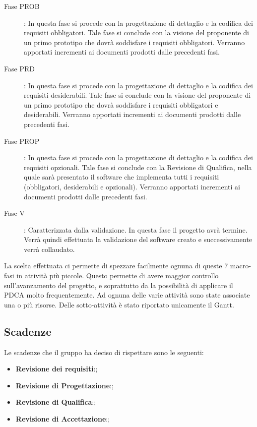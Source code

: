 \begin{description}
			\item[Fase PROB]: In questa fase si procede con la progettazione di dettaglio e la codifica dei requisiti obbligatori. Tale fase si conclude con la visione del proponente di un primo prototipo che dovrà soddisfare i requisiti obbligatori. Verranno apportati incrementi ai documenti prodotti dalle precedenti fasi.
			\item[Fase PRD]: In questa fase si procede con la progettazione di dettaglio e la codifica dei requisiti desiderabili. Tale fase si conclude con la visione del proponente di un primo prototipo che dovrà soddisfare i requisiti obbligatori e desiderabili. Verranno apportati incrementi ai documenti prodotti dalle precedenti fasi.
			\item[Fase PROP]: In questa fase si procede con la progettazione di dettaglio e la codifica dei requisiti opzionali. Tale fase si conclude con la Revisione di Qualifica, nella quale sarà presentato il software che implementa tutti i requisiti (obbligatori, desiderabili e opzionali). Verranno apportati incrementi ai documenti prodotti dalle precedenti fasi.
			\item[Fase V]: Caratterizzata dalla validazione. In questa fase il progetto avrà termine. Verrà quindi effettuata la validazione del software creato e successivamente verrà collaudato.
		\end{description}
		La scelta effettuata ci permette di spezzare facilmente ognuna di queste 7 macro-fasi in attività più piccole. Questo permette di avere maggior controllo sull'avanzamento del progetto, e soprattutto da la possibilità di applicare il PDCA molto frequentemente.
		Ad ognuna delle varie attività sono state associate una o più risorse. Delle sotto-attività è stato riportato unicamente il Gantt.
	\subsection{Scadenze}
		Le scadenze che il gruppo \groupname ha deciso di rispettare sono le seguenti:
		\begin{itemize}
			\item \textbf{Revisione dei requisiti}:;
			\item \textbf{Revisione di Progettazione}:;
			\item \textbf{Revisione di Qualifica}:;
			\item \textbf{Revisione di Accettazione}:;
		\end{itemize}